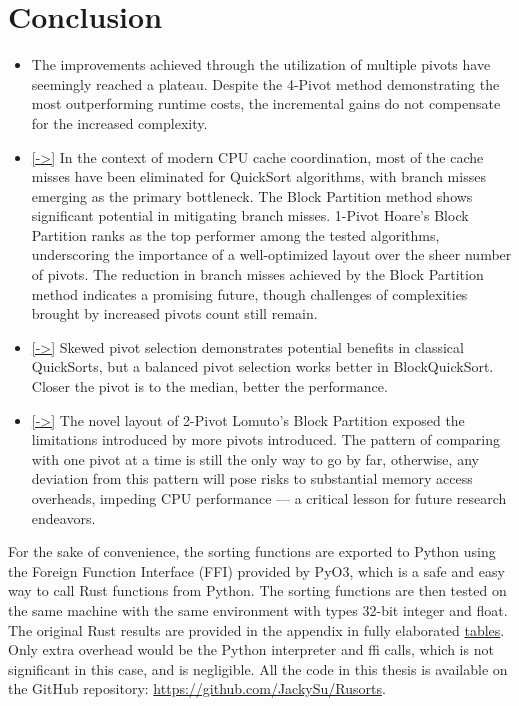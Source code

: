 \documentclass[a4paper,oneside,12pt]{book}
\begin{document}

\section{Conclusion}
\begin{itemize}
\item The improvements achieved through the utilization of multiple pivots have seemingly reached a plateau. Despite the 4-Pivot method demonstrating the most outperforming runtime costs, the incremental gains do not compensate for the increased complexity.
\item \hyperlink{BranchMissMatterMoreThanCache}{[->]} In the context of modern CPU cache coordination, most of the cache misses have been eliminated for QuickSort algorithms, with branch misses emerging as the primary bottleneck. The Block Partition method shows significant potential in mitigating branch misses.
    1-Pivot Hoare's Block Partition ranks as the top performer among the tested algorithms, underscoring the importance of a well-optimized layout over the sheer number of pivots.
    The reduction in branch misses achieved by the Block Partition method indicates a promising future, though challenges of complexities brought by increased pivots count still remain.
\item \hyperlink{UnnecessarySkewed}{[->]} Skewed pivot selection demonstrates potential benefits in classical QuickSorts, but a balanced pivot selection works better in BlockQuickSort. Closer the pivot is to the median, better the performance.
\item \hyperlink{OnlyWayToGo}{[->]} The novel layout of 2-Pivot Lomuto's Block Partition exposed the limitations introduced by more pivots introduced. The pattern of comparing with one pivot at a time is still the only way to go by far,
    otherwise, any deviation from this pattern will pose risks to substantial memory access overheads, impeding CPU performance --- a critical lesson for future research endeavors.
\end{itemize}


For the sake of convenience, the sorting functions are exported to Python using the Foreign Function Interface (FFI) provided by PyO3, which is a safe and easy way to call Rust functions from Python.
The sorting functions are then tested on the same machine with the same environment with types 32-bit integer and float. The original Rust results are provided in the appendix in fully elaborated \hyperlink{FullTables}{tables}.
Only extra overhead would be the Python interpreter and ffi calls, which is not significant in this case, and is negligible. All the code in this thesis is available on the GitHub repository: \url{https://github.com/JackySu/Rusorts}.
\end{document}
